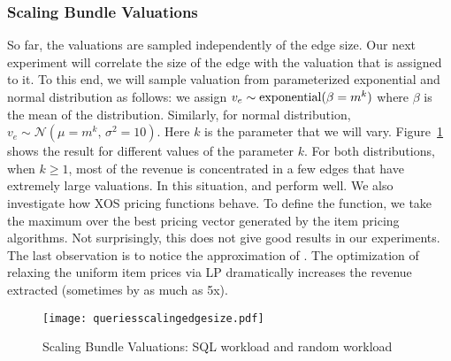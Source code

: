 \subsubsection{Scaling Bundle Valuations} So far, the valuations are sampled independently of the edge size. Our next experiment will correlate the size of the edge with the valuation that is assigned to it. To this end, we will sample valuation from parameterized exponential and normal distribution as follows: we assign $v_e \sim {\rm exponential}(\beta = m^k)$ where $\beta$ is the mean of the distribution. Similarly, for normal distribution, $v_e \sim \mathcal{N}(\mu = m^k,\, \sigma^2 = 10)$. Here $k$ is the parameter that we will vary. Figure~\ref{fig:scalingedge} shows the result for different values of the parameter $k$. For both distributions, when $k \geq 1$, most of the revenue is concentrated in a few edges that have extremely large valuations. In this situation, \lpip and \ubp perform well. We also investigate how XOS pricing functions behave. To define the function, we take the maximum over the best pricing vector generated by the item pricing algorithms. Not surprisingly, this does not give good results in our experiments. The last observation is to notice the approximation of \uip. The optimization of relaxing the uniform item prices via  LP dramatically increases the revenue extracted (sometimes by as much as 5x).

\begin{figure}[!t]
	\centering
	\texttt{[image: queriesscalingedgesize.pdf]}
	\caption{Scaling Bundle Valuations: SQL workload and random workload} \label{fig:scalingedge}
\end{figure}  

